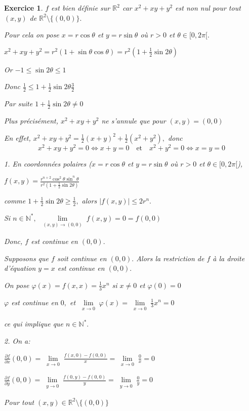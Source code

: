 \documentclass[11pt,a4paper]{report}
\newtheorem{exo}{Exercice}[section]
\begin{document}
\begin{exo}
$f$ est bien définie sur $\mathbb{R}^2$ car $x^2+xy+y^2$ est non nul pour tout $(x,y)$ de $\mathbb{R}^2\setminus\{(0,0)\}.$

Pour cela on pose $x=r\cos \theta$ et $y=r\sin\theta$ où $r>0$ et $\theta\in [0,2\pi[.$

$x^2+xy+y^2=r^2(1+\sin\theta\cos\theta)=r^2(1+\frac{1}{2}\sin2\theta)$

Or $-1\leq \sin 2\theta \leq1$

Donc $\frac{1}{2}\leq 1+\frac{1}{2}\sin 2\theta\frac{3}{2}$

Par suite $1+\frac{1}{2}\sin 2\theta\neq0$

Plus précisément, $x^2+xy+y^2$ ne s'annule que pour $(x,y)=(0,0)$

En effet, $x^2+xy+y^2=\frac{1}{2}(x+y)^2+\frac{1}{2}(x^2+y^2),$ donc
$$x^2+xy+y^2=0\Leftrightarrow x+y=0\quad\mbox{et}\quad x^2+y^2=0\Leftrightarrow x=y=0$$

1. En coordonnées polaires ($x=r\cos \theta$ et $y=r\sin\theta$ où $r>0$ et $\theta\in [0,2\pi[$),

$f(x,y)=\frac{r^{n+2}\cos^2\theta \sin^n\theta}{r^2 (1+\frac{1}{2}\sin2\theta)}$

comme $1+\frac{1}{2}\sin2\theta\geq\frac{1}{2},$ alors $|f(x,y)|\leq 2r^n.$

Si $n\in \mathbb{N}^{*},\;\lim\limits_{\substack{(x,y) \rightarrow (0,0)}}f(x,y)=0=f(0,0)$

Donc, $f$ est continue en $(0,0).$

Supposons que $f$ soit continue en $(0,0).$ Alors la restriction de $f$ à la droite d'équation $y=x$ est continue en $(0,0).$

On pose $\varphi(x)=f(x,x)=\frac{1}{3}x^n$ si $x\neq0$ et $\varphi(0)=0$

$\varphi$ est continue en $0,$ et $\lim\limits_{\substack{x\rightarrow0}}\varphi(x)=\lim\limits_{\substack{x\rightarrow0}}\frac{1}{3}x^n=0$

ce qui implique que $n\in \mathbb{N}^{*}.$

2. On a:

$\frac{\partial f}{\partial x}(0,0)=\lim\limits_{\substack{x\rightarrow0}}\frac{f(x,0)-f(0,0)}{x}=\lim\limits_{\substack{x\rightarrow0}}\frac{0}{x}=0$

$\frac{\partial f}{\partial y}(0,0)=\lim\limits_{\substack{y\rightarrow0}}\frac{f(0,y)-f(0,0)}{y}=\lim\limits_{\substack{y\rightarrow0}}\frac{0}{y}=0$

Pour tout $(x,y)\in\mathbb{R}^2\setminus\{(0,0)\}$


\end{exo}
\end{document}
